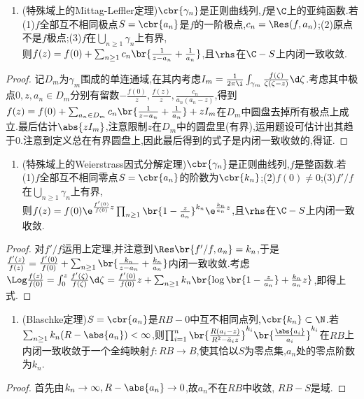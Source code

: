 \documentclass{article}
\begin{document}
\begin{enumerate}[resume]
    \item (特殊域上的Mittag-Leffler定理)$\cbr{\gamma_n}$是正则曲线列,$f$是$\C$上的亚纯函数.若\\
    (1)$f$全部互不相同极点$S=\cbr{a_n}$是$f$的一阶极点,$c_n=\Res(f,a_n)$;(2)原点不是$f$极点;(3)$f$在$\bigcup_{n\geq 1}\gamma_n$上有界,\\
    则$f(z)=f(0)+\sum_{n\geq 1}c_n\br{\frac{1}{z-a_n}+\frac{1}{a_n}}$,且$\rhs$在$\C-S$上内闭一致收敛.\label{特殊域上的ML定理}
\end{enumerate}
\begin{proof}
    记$D_m$为$\gamma_m$围成的单连通域,在其内考虑$I_m=\frac{1}{2\pi\i}\int_{\gamma_m}\frac{f(\zeta)}{\zeta(\zeta-z)}\d\zeta$.考虑其中极点$0,z,a_n\in D_m$分别有留数$-\frac{f(0)}{z},\frac{f(z)}{z},\frac{c_n}{a_n(a_n-z)}$,得到$f(z)=f(0)+\sum_{a_n\in D_m}c_n\br{\frac{1}{z-a_n}+\frac{1}{a_n}}+zI_m$在$D_m$中圆盘去掉所有极点上成立.最后估计$\abs{zI_m}$,注意限制$z$在$D_m$中的圆盘里(有界),运用题设可估计出其趋于0.注意到定义总在有界圆盘上,因此最后得到的式子是内闭一致收敛的,得证.
\end{proof}

\begin{enumerate}[resume]
    \item (特殊域上的Weierstrass因式分解定理)$\cbr{\gamma_n}$是正则曲线列,$f$是整函数.若\\
    (1)$f$全部互不相同零点$S=\cbr{a_n}$的阶数为$\cbr{k_n}$;(2)$f(0)\neq 0$;(3)$f'/f$在$\bigcup_{n\geq 1}\gamma_n$上有界,\\
    则$f(z)=f(0)\e^{\frac{f'(0)}{f(0)}z}\prod_{n\geq 1}\br{1-\frac{z}{a_n}}^{k_n}\e^{\frac{k_n}{a_n}z}$,且$\rhs$在$\C-S$上内闭一致收敛.\label{特殊域上的WFac定理}
\end{enumerate}
\begin{proof}
    对$f'/f$运用上定理,并注意到$\Res\br{f'/f,a_n}=k_n$,于是$\frac{f'(z)}{f(z)}=\frac{f'(0)}{f(0)}+\sum_{n\geq 1}\br{\frac{k_n}{z-a_n}+\frac{k_n}{a_n}}$内闭一致收敛.考虑$\Log\frac{f(z)}{f(0)}=\int_{0}^{z}\frac{f'(\zeta)}{f(\zeta)}\d\zeta=\frac{f'(0)}{f(0)}z+\sum_{n\geq 1}k_n\br{\log\br{1-\frac{z}{a_n}}+\frac{k_n}{a_n}z}$,即得上式.
\end{proof}

\begin{enumerate}[resume]
    \item (Blaschke定理)$S=\cbr{a_n}$是$RB-0$中互不相同点列,$\cbr{k_n}\subset\N$.若$\sum_{n\geq 1}k_n(R-\abs{a_n})<\infty$,则$\prod_{i=1}^n\br{\frac{R(a_i-z)}{R^2-\bar{a}_iz}}^{k_i}\br{\frac{\abs{a_i}}{a_i}}^{k_i}$在$RB$上内闭一致收敛于一个全纯映射$f:RB\to B$,使其恰以$S$为零点集,$a_n$处的零点阶数为$k_n$.
\end{enumerate}
\begin{proof}
    首先由$k_n\to \infty, R-\abs{a_n}\to 0$,故$a_n$不在$RB$中收敛, $RB-S$是域.\tbc
\end{proof}
\end{document}
